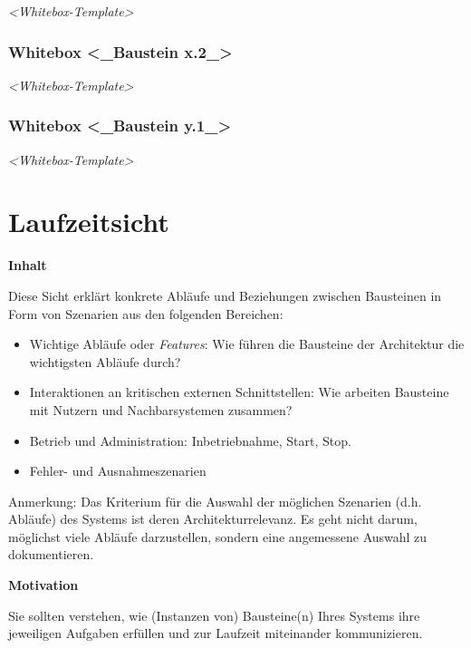 \documentclass[
]{article}
\begin{document}
\emph{\textless Whitebox-Template\textgreater{}}

\hypertarget{_whitebox_baustein_x_2}{%
\subsubsection{Whitebox \textless\_Baustein
x.2\_\textgreater{}}\label{_whitebox_baustein_x_2}}

\emph{\textless Whitebox-Template\textgreater{}}

\hypertarget{_whitebox_baustein_y_1}{%
\subsubsection{Whitebox \textless\_Baustein
y.1\_\textgreater{}}\label{_whitebox_baustein_y_1}}

\emph{\textless Whitebox-Template\textgreater{}}

\hypertarget{section-runtime-view}{%
\section{Laufzeitsicht}\label{section-runtime-view}}

\textbf{Inhalt}

Diese Sicht erklärt konkrete Abläufe und Beziehungen zwischen Bausteinen
in Form von Szenarien aus den folgenden Bereichen:

\begin{itemize}
\item
  Wichtige Abläufe oder \emph{Features}: Wie führen die Bausteine der
  Architektur die wichtigsten Abläufe durch?
\item
  Interaktionen an kritischen externen Schnittstellen: Wie arbeiten
  Bausteine mit Nutzern und Nachbarsystemen zusammen?
\item
  Betrieb und Administration: Inbetriebnahme, Start, Stop.
\item
  Fehler- und Ausnahmeszenarien
\end{itemize}

Anmerkung: Das Kriterium für die Auswahl der möglichen Szenarien (d.h.
Abläufe) des Systems ist deren Architekturrelevanz. Es geht nicht darum,
möglichst viele Abläufe darzustellen, sondern eine angemessene Auswahl
zu dokumentieren.

\textbf{Motivation}

Sie sollten verstehen, wie (Instanzen von) Bausteine(n) Ihres Systems
ihre jeweiligen Aufgaben erfüllen und zur Laufzeit miteinander
kommunizieren.
\end{document}
